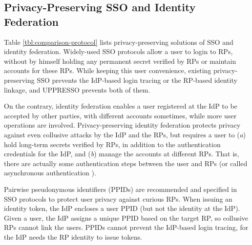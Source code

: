 

\subsection{Privacy-Preserving SSO and Identity Federation}
\label{subsec-solutions}
Table \ref{tbl:comparison-protocol} lists privacy-preserving solutions of SSO and identity federation.
Widely-used SSO protocols \cite{OpenIDConnect,rfc6749,SAML,SAMLIdentifier} allow a user to login to RPs,
        without by himself holding any permanent secret verified by RPs
        or maintain accounts for these RPs.
While keeping this user convenience,
 existing privacy-preserving SSO \cite{BrowserID,SPRESSO,NIST2017draft} prevents the IdP-based login tracing or the RP-based identity linkage,
    and UPPRESSO prevents both of them.

On the contrary, identity federation enables a user registered at the IdP to be accepted by other parties,
            with different accounts sometimes,
        while more user operations are involved.
Privacy-preserving identity federation \cite{ELPASSO,UnlimitID,hyperledge-idemix,PseudoID,Opaak}
    protects privacy against even collusive attacks by the IdP and the RPs,
    but requires a user to (\emph{a}) hold long-term secrets verified by RPs,
            in addition to the authentication credentials for the IdP,
                and (\emph{b}) manage the accounts at different RPs.
That is, there are actually some authentication steps between the user and RPs (or called asynchronous authentication \cite{ELPASSO}).


Pairwise pseudonymous identifiers (PPIDs) are recommended \cite{NIST2017draft}
 and specified in SSO protocols \cite{OpenIDConnect, SAMLIdentifier} to protect user privacy against curious RPs.
When issuing an identity token,
        the IdP encloses a user PPID (but not the identity at the IdP).
Given a user,
    the IdP assigns a unique PPID based on the target RP,
    so collusive RPs cannot link the users.
PPIDs cannot prevent the IdP-based login tracing,
 for the IdP needs the RP identity to issue tokens.



